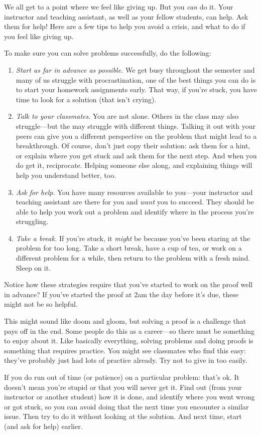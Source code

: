 \documentclass[../../../include/open-logic-section]{subfiles}
\begin{document}


We all get to a point where we feel like giving up. But you \emph{can}
do it. Your instructor and teaching assistant, as well as your fellow
students, can help. Ask them for help!{}  Here are a few tips to help
you avoid a crisis, and what to do if you feel like giving up.

To make sure you can solve problems successfully, do the
following:
\begin{enumerate}
\item \emph{Start as far in advance as possible.} We get busy
  throughout the semester and many of us struggle with
  procrastination, one of the best things you can do is to start your
  homework assignments early. That way, if you're stuck, you have time
  to look for a solution (that isn't crying).
\item \emph{Talk to your classmates}.  You are not alone. Others in
  the class may also struggle---but the may struggle with different
  things. Talking it out with your peers can give you a different
  perspective on the problem that might lead to a breakthrough.  Of
  course, don't just copy their solution: ask them for a hint, or
  explain where you get stuck and ask them for the next step. And when
  you do get it, reciprocate. Helping someone else along, and
  explaining things will help you understand better, too.
\item \emph{Ask for help.} You have many resources available to
  you---your instructor and teaching assistant are there for you and
  \emph{want} you to succeed. They should be able to help you work out
  a problem and identify where in the process you're struggling.
\item \emph{Take a break.} If you're stuck, it \emph{might} be because
  you've been staring at the problem for too long. Take a short break,
  have a cup of tea, or work on a different problem for a while, then
  return to the problem with a fresh mind. Sleep on it.
\end{enumerate}

Notice how these strategies require that you've started to work on the
proof well in advance? If you've started the proof at 2am the day
before it's due, these might not be so helpful.

This might sound like doom and gloom, but solving a proof is a
challenge that pays off in the end. Some people do this as a
career---so there must be something to enjoy about it. Like basically
everything, solving problems and doing proofs is something that
requires practice.  You might see classmates who find this easy:
they've probably just had lots of practice already.  Try not to give
in too easily.

If you do run out of time (or patience) on a particular problem:
that's ok. It doesn't mean you're stupid or that you will never get
it. Find out (from your instructor or another student) how it is done,
and identify where you went wrong or got stuck, so you can avoid doing
that the next time you encounter a similar issue.  Then try to do it
without looking at the solution.  And next time, start (and ask for
help) earlier.
\end{document}
